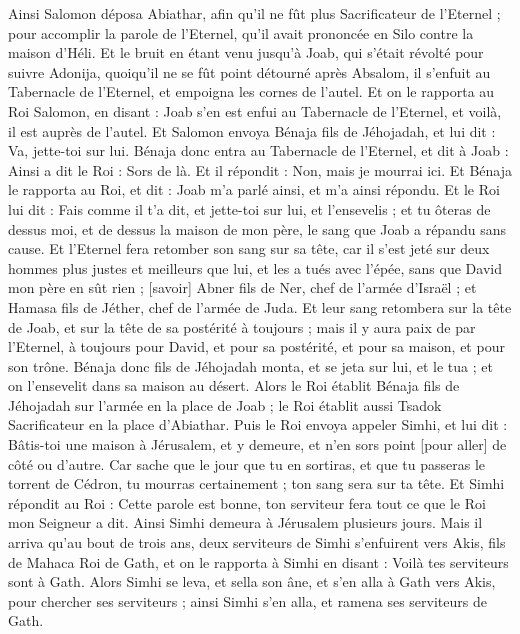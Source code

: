 \begin{multicols}{2}
Ainsi Salomon déposa Abiathar, afin qu'il ne fût plus Sacrificateur de l'Eternel ; pour accomplir la parole de l'Eternel, qu'il avait prononcée en Silo contre la maison d'Héli.
Et le bruit en étant venu jusqu'à Joab, qui s'était révolté pour suivre Adonija, quoiqu'il ne se fût point détourné après Absalom, il s'enfuit au Tabernacle de l'Eternel, et empoigna les cornes de l'autel.
Et on le rapporta au Roi Salomon, en disant : Joab s'en est enfui au Tabernacle de l'Eternel, et voilà, il est auprès de l'autel. Et Salomon envoya Bénaja fils de Jéhojadah, et lui dit : Va, jette-toi sur lui.
Bénaja donc entra au Tabernacle de l'Eternel, et dit à Joab : Ainsi a dit le Roi : Sors de là. Et il répondit : Non, mais je mourrai ici. Et Bénaja le rapporta au Roi, et dit : Joab m'a parlé ainsi, et m'a ainsi répondu.
Et le Roi lui dit : Fais comme il t'a dit, et jette-toi sur lui, et l'ensevelis ; et tu ôteras de dessus moi, et de dessus la maison de mon père, le sang que Joab a répandu sans cause.
Et l'Eternel fera retomber son sang sur sa tête, car il s'est jeté sur deux hommes plus justes et meilleurs que lui, et les a tués avec l'épée, sans que David mon père en sût rien ; [savoir] Abner fils de Ner, chef de l'armée d'Israël ; et Hamasa fils de Jéther, chef de l'armée de Juda.
Et leur sang retombera sur la tête de Joab, et sur la tête de sa postérité à toujours ; mais il y aura paix de par l'Eternel, à toujours pour David, et pour sa postérité, et pour sa maison, et pour son trône.
Bénaja donc fils de Jéhojadah monta, et se jeta sur lui, et le tua ; et on l'ensevelit dans sa maison au désert.
Alors le Roi établit Bénaja fils de Jéhojadah sur l'armée en la place de Joab ; le Roi établit aussi Tsadok Sacrificateur en la place d'Abiathar.
Puis le Roi envoya appeler Simhi, et lui dit : Bâtis-toi une maison à Jérusalem, et y demeure, et n'en sors point [pour aller] de côté ou d'autre.
Car sache que le jour que tu en sortiras, et que tu passeras le torrent de Cédron, tu mourras certainement ; ton sang sera sur ta tête.
Et Simhi répondit au Roi : Cette parole est bonne, ton serviteur fera tout ce que le Roi mon Seigneur a dit. Ainsi Simhi demeura à Jérusalem plusieurs jours.
Mais il arriva qu'au bout de trois ans, deux serviteurs de Simhi s'enfuirent vers Akis, fils de Mahaca Roi de Gath, et on le rapporta à Simhi en disant : Voilà tes serviteurs sont à Gath.
Alors Simhi se leva, et sella son âne, et s'en alla à Gath vers Akis, pour chercher ses serviteurs ; ainsi Simhi s'en alla, et ramena ses serviteurs de Gath.

\end{multicols}
